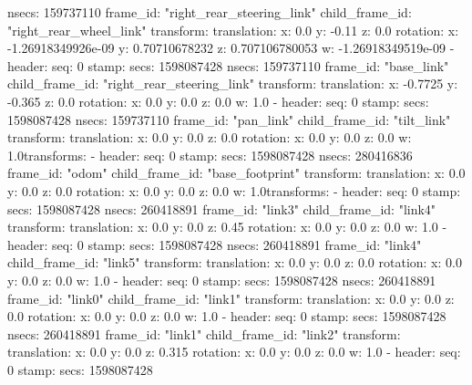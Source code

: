         nsecs: 159737110
      frame_id: "right_rear_steering_link"
    child_frame_id: "right_rear_wheel_link"
    transform: 
      translation: 
        x: 0.0
        y: -0.11
        z: 0.0
      rotation: 
        x: -1.26918349926e-09
        y: 0.70710678232
        z: 0.707106780053
        w: -1.26918349519e-09
  - 
    header: 
      seq: 0
      stamp: 
        secs: 1598087428
        nsecs: 159737110
      frame_id: "base_link"
    child_frame_id: "right_rear_steering_link"
    transform: 
      translation: 
        x: -0.7725
        y: -0.365
        z: 0.0
      rotation: 
        x: 0.0
        y: 0.0
        z: 0.0
        w: 1.0
  - 
    header: 
      seq: 0
      stamp: 
        secs: 1598087428
        nsecs: 159737110
      frame_id: "pan_link"
    child_frame_id: "tilt_link"
    transform: 
      translation: 
        x: 0.0
        y: 0.0
        z: 0.0
      rotation: 
        x: 0.0
        y: 0.0
        z: 0.0
        w: 1.0transforms: 
  - 
    header: 
      seq: 0
      stamp: 
        secs: 1598087428
        nsecs: 280416836
      frame_id: "odom"
    child_frame_id: "base_footprint"
    transform: 
      translation: 
        x: 0.0
        y: 0.0
        z: 0.0
      rotation: 
        x: 0.0
        y: 0.0
        z: 0.0
        w: 1.0transforms: 
  - 
    header: 
      seq: 0
      stamp: 
        secs: 1598087428
        nsecs: 260418891
      frame_id: "link3"
    child_frame_id: "link4"
    transform: 
      translation: 
        x: 0.0
        y: 0.0
        z: 0.45
      rotation: 
        x: 0.0
        y: 0.0
        z: 0.0
        w: 1.0
  - 
    header: 
      seq: 0
      stamp: 
        secs: 1598087428
        nsecs: 260418891
      frame_id: "link4"
    child_frame_id: "link5"
    transform: 
      translation: 
        x: 0.0
        y: 0.0
        z: 0.0
      rotation: 
        x: 0.0
        y: 0.0
        z: 0.0
        w: 1.0
  - 
    header: 
      seq: 0
      stamp: 
        secs: 1598087428
        nsecs: 260418891
      frame_id: "link0"
    child_frame_id: "link1"
    transform: 
      translation: 
        x: 0.0
        y: 0.0
        z: 0.0
      rotation: 
        x: 0.0
        y: 0.0
        z: 0.0
        w: 1.0
  - 
    header: 
      seq: 0
      stamp: 
        secs: 1598087428
        nsecs: 260418891
      frame_id: "link1"
    child_frame_id: "link2"
    transform: 
      translation: 
        x: 0.0
        y: 0.0
        z: 0.315
      rotation: 
        x: 0.0
        y: 0.0
        z: 0.0
        w: 1.0
  - 
    header: 
      seq: 0
      stamp: 
        secs: 1598087428
